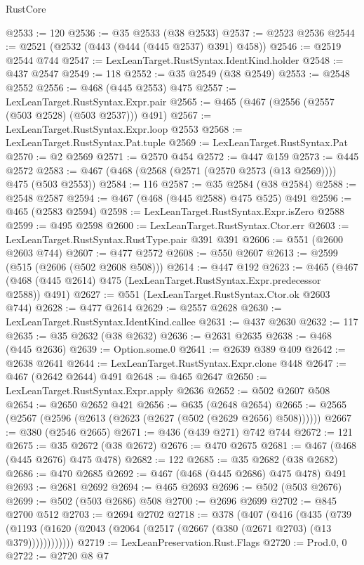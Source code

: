 \begin{lexlean}{RustCore}
\begin{coremodule}
@2533 := 120
@2536 := @35 @2533 (@38 @2533)
@2537 := @2523 @2536
@2544 := @2521 (@2532 (@443 (@444 (@445 @2537) @391) @458))
@2546 := @2519 @2544 @744
@2547 := LexLeanTarget.RustSyntax.IdentKind.holder
@2548 := @437 @2547
@2549 := 118
@2552 := @35 @2549 (@38 @2549)
@2553 := @2548 @2552
@2556 := @468 (@445 @2553) @475
@2557 := LexLeanTarget.RustSyntax.Expr.pair
@2565 := @465 (@467 (@2556 (@2557 (@503 @2528) (@503 @2537))) @491)
@2567 := LexLeanTarget.RustSyntax.Expr.loop @2553
@2568 := LexLeanTarget.RustSyntax.Pat.tuple
@2569 := LexLeanTarget.RustSyntax.Pat
@2570 := @2 @2569
@2571 := @2570 @454
@2572 := @447 @159
@2573 := @445 @2572
@2583 := @467 (@468 (@2568 (@2571 (@2570 @2573 (@13 @2569)))) @475 (@503 @2553))
@2584 := 116
@2587 := @35 @2584 (@38 @2584)
@2588 := @2548 @2587
@2594 := @467 (@468 (@445 @2588) @475 @525) @491
@2596 := @465 (@2583 @2594)
@2598 := LexLeanTarget.RustSyntax.Expr.isZero @2588
@2599 := @495 @2598
@2600 := LexLeanTarget.RustSyntax.Ctor.err
@2603 := LexLeanTarget.RustSyntax.RustType.pair @391 @391
@2606 := @551 (@2600 @2603 @744)
@2607 := @477 @2572
@2608 := @550 @2607
@2613 := @2599 (@515 (@2606 (@502 @2608 @508)))
@2614 := @447 @192
@2623 := @465 (@467 (@468 (@445 @2614) @475 (LexLeanTarget.RustSyntax.Expr.predecessor @2588)) @491)
@2627 := @551 (LexLeanTarget.RustSyntax.Ctor.ok @2603 @744)
@2628 := @477 @2614
@2629 := @2557 @2628
@2630 := LexLeanTarget.RustSyntax.IdentKind.callee
@2631 := @437 @2630
@2632 := 117
@2635 := @35 @2632 (@38 @2632)
@2636 := @2631 @2635
@2638 := @468 (@445 @2636)
@2639 := Option.some.{0}
@2641 := @2639 @389 @409
@2642 := @2638 @2641
@2644 := LexLeanTarget.RustSyntax.Expr.clone @448
@2647 := @467 (@2642 @2644) @491
@2648 := @465 @2647
@2650 := LexLeanTarget.RustSyntax.Expr.apply @2636
@2652 := @502 @2607 @508
@2654 := @2650 @2652 @421
@2656 := @635 (@2648 @2654)
@2665 := @2565 (@2567 (@2596 (@2613 (@2623 (@2627 (@502 (@2629 @2656) @508))))))
@2667 := @380 (@2546 @2665)
@2671 := @436 (@439 @271) @742 @744
@2672 := 121
@2675 := @35 @2672 (@38 @2672)
@2676 := @470 @2675
@2681 := @467 (@468 (@445 @2676) @475 @478)
@2682 := 122
@2685 := @35 @2682 (@38 @2682)
@2686 := @470 @2685
@2692 := @467 (@468 (@445 @2686) @475 @478) @491
@2693 := @2681 @2692
@2694 := @465 @2693
@2696 := @502 (@503 @2676)
@2699 := @502 (@503 @2686) @508
@2700 := @2696 @2699
@2702 := @845 @2700 @512
@2703 := @2694 @2702
@2718 := @378
    (@407
      (@416
        (@435
          (@739 (@1193 (@1620 (@2043 (@2064 (@2517 (@2667 (@380 (@2671 @2703) (@13 @379))))))))))))
@2719 := LexLeanPreservation.Rust.Flags
@2720 := Prod.{0, 0}
@2722 := @2720 @8 @7

\end{coremodule}
\end{lexlean}
